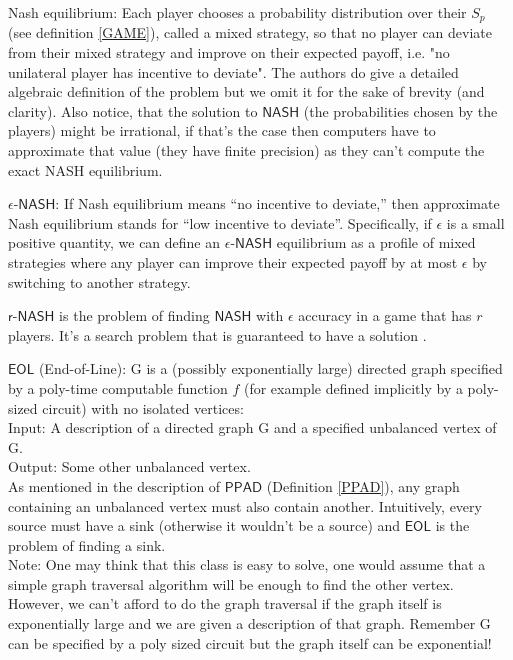 \documentclass[11pt]{article}
\newcommand{\PPAD}{\mathsf{PPAD}}
\newcommand{\NASH}{\mathsf{NASH}}
\newcommand{\eNASH}{\mathsf{\text{$\epsilon$-}NASH}}
\newcommand{\rNASH}{\mathsf{\text{$r$-}NASH}}
\newcommand{\eol}{\mathsf{EOL}}
\begin{document}
\begin{definition}
    \label{NASH}
    Nash equilibrium: Each player chooses a probability distribution over their $S_p$ (see definition \ref{GAME}), called a mixed strategy, so that no player can deviate from their mixed strategy and improve on their expected payoff, i.e. "no unilateral player has incentive to deviate". The authors do give a detailed algebraic definition of the problem but we omit it for the sake of brevity (and clarity). Also notice, that the solution to $\NASH$ (the probabilities chosen by the players) might be irrational, if that's the case then computers have to approximate that value (they have finite precision) as they can't compute the exact NASH equilibrium.
\end{definition}
\begin{definition}
    \label{eNash}
    $\eNASH$: If Nash equilibrium means “no incentive to deviate,” then approximate Nash equilibrium stands for “low incentive to deviate”.
    Specifically, if $\epsilon$ is a small positive quantity, we can define an $\eNASH$ equilibrium as a profile of mixed strategies where any player can improve their expected payoff by at most $\epsilon$ by switching to another strategy.
    
\end{definition}

\begin{definition}
\label{rNash}
$\rNASH$ is the problem of finding $\NASH$ with $\epsilon$ accuracy in a game that has $r$ players.
It's a search problem that is guaranteed to have a solution \cite{Nash48}.
\end{definition}

\begin{definition}
    \label{eol}
    $\eol$ (End-of-Line): G is a (possibly exponentially large) directed graph specified by a poly-time computable function $f$ (for example defined implicitly by a poly-sized circuit) with no isolated vertices:\\
    Input: A description of a directed  graph G and a specified unbalanced vertex of G.\\
    Output: Some other unbalanced vertex.\\
    As mentioned in the description of $\PPAD$ (Definition \ref{PPAD}), any graph containing an unbalanced vertex must also contain another.
    Intuitively, every source must have a sink (otherwise it wouldn't be a source) and $\eol$ is the problem of finding a sink.\\
    Note: One may think that this class is easy to solve, one would assume that a simple graph traversal algorithm will be enough to find the other vertex. However, we can't afford to do the graph traversal if the graph itself is exponentially large and we are given a description of that graph. Remember G can be specified by a poly sized circuit but the graph itself can be exponential!
\end{definition}
\end{document}
